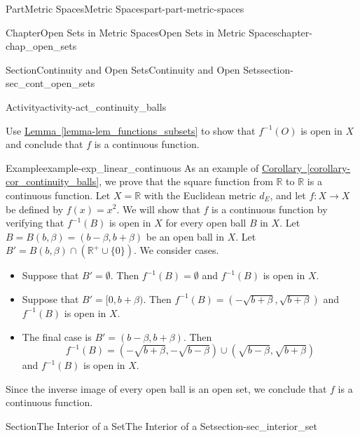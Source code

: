 \documentclass[oneside,10pt,]{book}
\newcommand{\xreffont}{\relax}
\numberwithin{equation}{chapter}
\newcommand{\R}{\mathbb{R}}
\begin{document}
\begin{partptx}{Part}{Metric Spaces}{}{Metric Spaces}{}{}{part-part-metric-spaces}
\begin{chapterptx}{Chapter}{Open Sets in Metric Spaces}{}{Open Sets in Metric Spaces}{}{}{chapter-chap_open_sets}
\begin{sectionptx}{Section}{Continuity and Open Sets}{}{Continuity and Open Sets}{}{}{section-sec_cont_open_sets}
\begin{activity}{Activity}{}{activity-act_continuity_balls}
\begin{enumerate}[font=\bfseries,label=(\alph*),ref=\alph*]
\begin{enumerate}[font=\bfseries,label=(\roman*),ref=\theenumi.\roman*]
\begin{equation*}
\end{equation*}
Use \hyperref[lemma-lem_functions_subsets]{Lemma~{\xreffont\ref{lemma-lem_functions_subsets}}} to show that \(f^{-1}(O)\) is open in \(X\) and conclude that \(f\) is a continuous function.%
\end{enumerate}%
\end{enumerate}%
\end{activity}%
\begin{example}{Example}{}{example-exp_linear_continuous}%
As an example of \hyperref[corollary-cor_continuity_balls]{Corollary~{\xreffont\ref{corollary-cor_continuity_balls}}}, we prove that the square function from \(\R\) to \(\R\) is a continuous function. Let \(X = \R\) with the Euclidean metric \(d_E\), and let \(f: X \to X\) be defined by \(f(x) = x^2\). We will show that \(f\) is a continuous function by verifying that \(f^{-1}(B)\) is open in \(X\) for every open ball \(B\) in \(X\). Let \(B = B(b,\beta) = (b-\beta,
b+\beta)\) be an open ball in \(X\). Let \(B' = B(b,\beta) \cap (\R^+ \cup \{0\})\). We consider cases.%
\begin{itemize}[label=\textbullet]
\item{}Suppose that \(B' = \emptyset\). Then \(f^{-1}(B) = \emptyset\) and \(f^{-1}(B)\) is open in \(X\).%
\item{}Suppose that \(B' = [0, b+\beta)\). Then \(f^{-1}(B) = (-\sqrt{b+\beta}, \sqrt{b+\beta})\) and \(f^{-1}(B)\) is open in \(X\).%
\item{}The final case is \(B' = (b-\beta, b+\beta)\). Then%
\begin{equation*}
f^{-1}(B) = (-\sqrt{b+\beta}, -\sqrt{b-\beta}) \cup (\sqrt{b-\beta}, \sqrt{b+\beta})
\end{equation*}
and \(f^{-1}(B)\) is open in \(X\).%
\end{itemize}
%
\par
Since the inverse image of every open ball is an open set, we conclude that \(f\) is a continuous function.%
\end{example}
\end{sectionptx}
%
%
\typeout{************************************************}
\typeout{************************************************}
%
\begin{sectionptx}{Section}{The Interior of a Set}{}{The Interior of a Set}{}{}{section-sec_interior_set}

\end{sectionptx}
\end{chapterptx}
\end{partptx}
\end{document}

